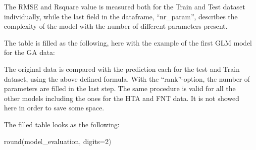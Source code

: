 \documentclass[
]{article}
\newenvironment{Shaded}{\begin{snugshade}}{\end{snugshade}}
\newcommand{\AttributeTok}[1]{\textcolor[rgb]{0.77,0.63,0.00}{#1}}
\newcommand{\DecValTok}[1]{\textcolor[rgb]{0.00,0.00,0.81}{#1}}
\newcommand{\DocumentationTok}[1]{\textcolor[rgb]{0.56,0.35,0.01}{\textbf{\textit{#1}}}}
\newcommand{\FloatTok}[1]{\textcolor[rgb]{0.00,0.00,0.81}{#1}}
\newcommand{\FunctionTok}[1]{\textcolor[rgb]{0.00,0.00,0.00}{#1}}
\newcommand{\NormalTok}[1]{#1}
\newcommand{\OtherTok}[1]{\textcolor[rgb]{0.56,0.35,0.01}{#1}}
\newcommand{\SpecialCharTok}[1]{\textcolor[rgb]{0.00,0.00,0.00}{#1}}
\newcommand{\StringTok}[1]{\textcolor[rgb]{0.31,0.60,0.02}{#1}}
\begin{document}
The RMSE and Rsquare value is measured both for the Train and Test
dataset individually, while the last field in the dataframe,
``nr\_param'', describes the complexity of the model with the number of
different parameters present.

The table is filled as the following, here with the example of the first
GLM model for the GA data:

\begin{Shaded}
\end{Shaded}

The original data is compared with the prediction each for the test and
Train dataset, using the above defined formula. With the
``rank''-option, the number of parameters are filled in the last step.
The same procedure is valid for all the other models including the ones
for the HTA and FNT data. It is not showed here in order to save some
space.

The filled table looks as the following:

\begin{Shaded}
\begin{Highlighting}[]
\FunctionTok{round}\NormalTok{(model\_evaluation, }\AttributeTok{digits=}\DecValTok{2}\NormalTok{) }
\end{Highlighting}
\end{Shaded}
\end{document}
